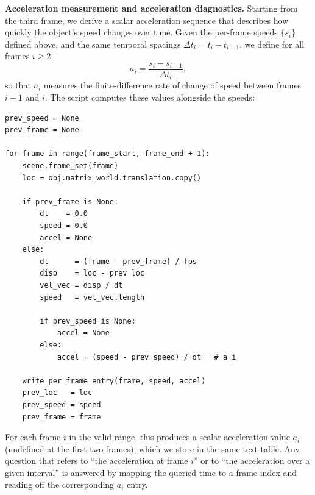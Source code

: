\noindent\textbf{Acceleration measurement and acceleration diagnostics.}
Starting from the third frame, we derive a scalar acceleration sequence that describes how quickly the object’s speed changes over time. Given the per-frame speeds \(\{s_i\}\) defined above, and the same temporal spacings \(\Delta t_i = t_i - t_{i-1}\), we define for all frames \(i \geq 2\)
\[
a_i = \frac{s_i - s_{i-1}}{\Delta t_i},
\]
so that \(a_i\) measures the finite-difference rate of change of speed between frames \(i-1\) and \(i\). The script computes these values alongside the speeds:
\begin{verbatim}
prev_speed = None
prev_frame = None

for frame in range(frame_start, frame_end + 1):
    scene.frame_set(frame)
    loc = obj.matrix_world.translation.copy()

    if prev_frame is None:
        dt    = 0.0
        speed = 0.0
        accel = None
    else:
        dt      = (frame - prev_frame) / fps
        disp    = loc - prev_loc
        vel_vec = disp / dt
        speed   = vel_vec.length

        if prev_speed is None:
            accel = None
        else:
            accel = (speed - prev_speed) / dt   # a_i

    write_per_frame_entry(frame, speed, accel)
    prev_loc   = loc
    prev_speed = speed
    prev_frame = frame
\end{verbatim}

For each frame \(i\) in the valid range, this produces a scalar acceleration value \(a_i\) (undefined at the first two frames), which we store in the same text table. Any question that refers to “the acceleration at frame \(i\)” or to “the acceleration over a given interval” is answered by mapping the queried time to a frame index and reading off the corresponding \(a_i\) entry.

